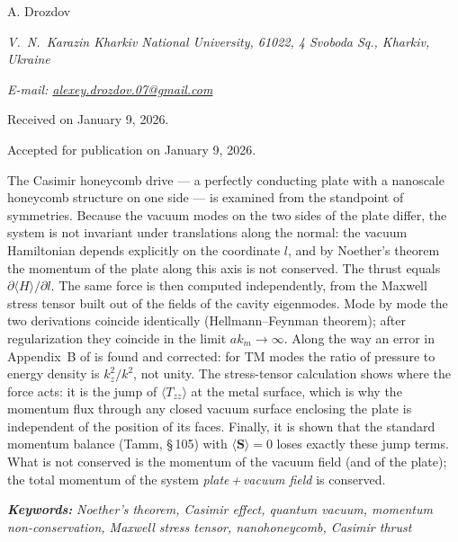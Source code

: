 \documentclass[twoside, 10pt]{article}
\makeatletter
\def\myemail{alexey.drozdov.07@gmail.com}
\def\mynameen{A. Drozdov}
\def\myworkplaceen{V.~N.~Karazin Kharkiv National University, 61022, 4 Svoboda Sq., Kharkiv, Ukraine}
\def\myreceiveden{Received on January 9, 2026.}
\def\myaccepteden{Accepted for publication on January 9, 2026.}
\def\myorcidlink{0009-0004-1386-4534}
\makeatother
\begin{document}
\centerline{\Large{\mynameen \,\orcidlink{\myorcidlink} }}
\vspace{3mm}
\centerline{\textit{\myworkplaceen}}
\centerline{\textit{E-mail: \href{mailto:\myemail}{\myemail}}}

\vspace{3mm}
\centerline{\myreceiveden}
\centerline{\myaccepteden}

\vspace{3.5mm}

The Casimir honeycomb drive \cite{Drozdov2024} --- a perfectly conducting plate with a
nanoscale honeycomb structure on one side --- is examined from the standpoint of symmetries.
Because the vacuum modes on the two sides of the plate differ, the system is not invariant under
translations along the normal: the vacuum Hamiltonian depends explicitly on the coordinate \(l\),
and by Noether's theorem the momentum of the plate along this axis is not conserved. The thrust equals
\(\partial\langle H\rangle/\partial l\). The same force is then computed independently, from the
Maxwell stress tensor built out of the fields of the cavity eigenmodes. Mode by mode the two
derivations coincide identically (Hellmann--Feynman theorem); after regularization they coincide
in the limit \(ak_m\to\infty\). Along the way an error in Appendix~B of \cite{Drozdov2024} is
found and corrected: for TM modes the ratio of pressure to energy density is \(k_z^2/k^2\), not
unity. The stress-tensor calculation shows where the force acts: it is the jump of
\(\langle T_{zz}\rangle\) at the metal surface, which is why the momentum flux through any closed
vacuum surface enclosing the plate is independent of the position of its faces. Finally, it is
shown that the standard momentum balance (Tamm, \S\,105) with \(\langle\mathbf S\rangle=0\) loses
exactly these jump terms. What is not conserved is the momentum of the vacuum field (and of the plate); the total momentum of the system \emph{plate\,+\,vacuum field} is conserved.

\vspace{3mm}

\noindent
\textbf{\textit{Keywords:}} \textit{Noether's theorem, Casimir effect, quantum vacuum, momentum non-conservation, Maxwell stress tensor, nanohoneycomb, Casimir thrust}

\selectfont
\end{document}
